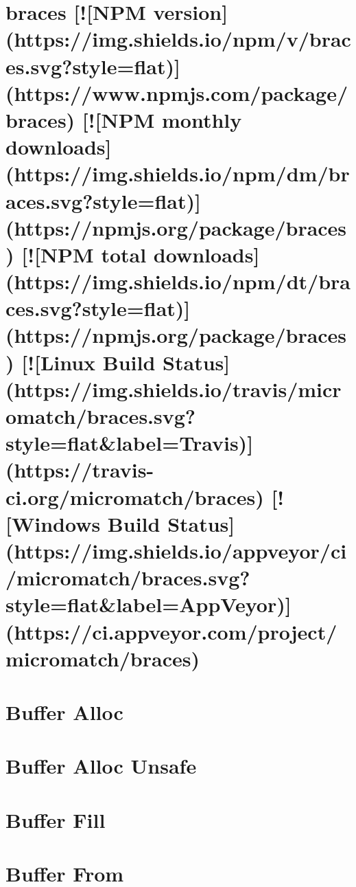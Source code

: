 \documentclass[twoside]{book}
\newcommand{\+}{\discretionary{\mbox{\scriptsize$\hookleftarrow$}}{}{}}
\begin{document}
\chapter{braces \mbox{[}!\mbox{[}N\+PM version\mbox{]}(https\+://img.shields.\+io/npm/v/braces.svg?style=flat)\mbox{]}(https\+://www.npmjs.\+com/package/braces) \mbox{[}!\mbox{[}N\+PM monthly downloads\mbox{]}(https\+://img.shields.\+io/npm/dm/braces.svg?style=flat)\mbox{]}(https\+://npmjs.org/package/braces) \mbox{[}!\mbox{[}N\+PM total downloads\mbox{]}(https\+://img.shields.\+io/npm/dt/braces.svg?style=flat)\mbox{]}(https\+://npmjs.org/package/braces) \mbox{[}!\mbox{[}Linux Build Status\mbox{]}(https\+://img.shields.\+io/travis/micromatch/braces.svg?style=flat\&label=Travis)\mbox{]}(https\+://travis-\/ci.org/micromatch/braces) \mbox{[}!\mbox{[}Windows Build Status\mbox{]}(https\+://img.shields.\+io/appveyor/ci/micromatch/braces.svg?style=flat\&label=App\+Veyor)\mbox{]}(https\+://ci.appveyor.\+com/project/micromatch/braces)}
\label{md_dsmacc_vis_degree_node_modules_braces_README}

\chapter{Buffer Alloc}
\label{md_dsmacc_vis_degree_node_modules_buffer-alloc_readme}

\chapter{Buffer Alloc Unsafe}
\label{md_dsmacc_vis_degree_node_modules_buffer-alloc-unsafe_readme}

\chapter{Buffer Fill}
\label{md_dsmacc_vis_degree_node_modules_buffer-fill_readme}

\chapter{Buffer From}
\label{md_dsmacc_vis_degree_node_modules_buffer-from_readme}

\end{document}
